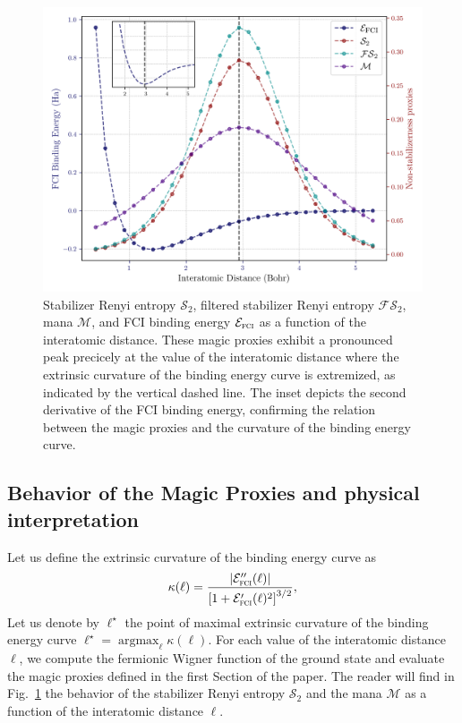 \documentclass[aps, prl, twocolumn, groupedaddress, reprint, floatfix, nofootinbib, longbibliography]{revtex4-2}
\DeclareMathOperator*{\argmax}{argmax}
\begin{document}
        \begin{figure}[ht]
        \centering
            \includegraphics[width=1.0
            \textwidth]{figures/magic_vs_distance.png}
            \caption{Stabilizer Renyi entropy $\mathcal S_2$, filtered stabilizer Renyi entropy $\mathcal{FS}_2$, mana $\mathcal M$, and FCI binding energy $\mathcal E_\textsc{fci}$ as a function of the interatomic distance. These magic proxies exhibit a pronounced peak precicely at the value of the interatomic distance where the extrinsic curvature of the binding energy curve is extremized, as indicated by the vertical dashed line. The inset depicts the second derivative of the FCI binding energy, confirming the relation between the magic proxies and the curvature of the binding energy curve.}
        \label{fig:magic_vs_distance}
        \end{figure}

    \subsection{Behavior of the Magic Proxies and physical interpretation}

        Let us define the extrinsic curvature of the binding energy curve as
        \begin{equation}
            \kappa(\ell) = \frac{\left|\mathcal E_\textsc{fci}''(\ell)\right|}{\left[1+\mathcal E_\textsc{fci}'(\ell)^2\right]^{3/2}},
        \end{equation}
        Let us denote by $\ell^\star$ the point of maximal extrinsic curvature of the binding energy curve $\ell^\star = \argmax_{\ell} \kappa(\ell)$.
        For each value of the interatomic distance $\ell$, we compute the fermionic Wigner function of the ground state and evaluate the magic proxies defined in the first Section of the paper. The reader will find in Fig.~\ref{fig:magic_vs_distance} the behavior of the stabilizer Renyi entropy $\mathcal S_2$ and the mana $\mathcal M$ as a function of the interatomic distance $\ell$.
\end{document}
